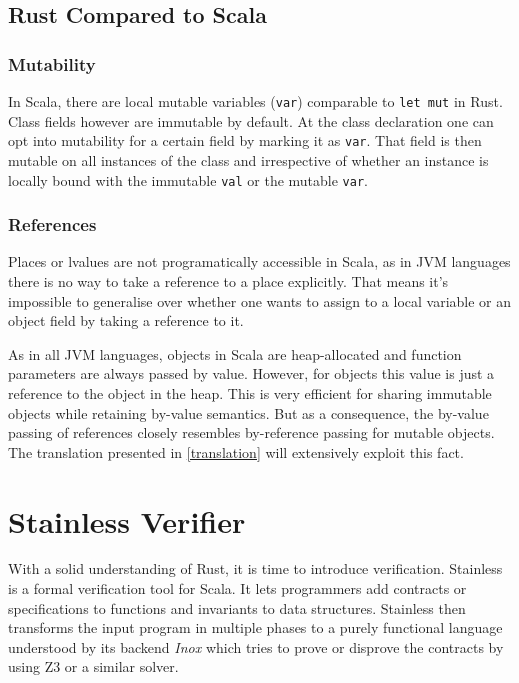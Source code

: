 \subsection{Rust Compared to Scala}

\subsubsection{Mutability}

In Scala, there are local mutable variables (\passthrough{\lstinline!var!})
comparable to \passthrough{\lstinline!let mut!} in Rust. Class fields however
are immutable by default. At the class declaration one can opt into mutability
for a certain field by marking it as \lstinline!var!. That field is then mutable
on all instances of the class and irrespective of whether an instance is locally
bound with the immutable \lstinline!val! or the mutable \lstinline!var!.

\subsubsection{References}

Places or lvalues are not programatically accessible in Scala, as in JVM
languages there is no way to take a reference to a place explicitly. That means
it's impossible to generalise over whether one wants to assign to a local
variable or an object field by taking a reference to it.

As in all JVM languages, objects in Scala are heap-allocated and function
parameters are always passed by value. However, for objects this value is just a
reference to the object in the heap. This is very efficient for sharing
immutable objects while retaining by-value semantics. But as a consequence, the
by-value passing of references closely resembles by-reference passing for
mutable objects. The translation presented in \autoref{translation} will
extensively exploit this fact.


\section{Stainless Verifier}

With a solid understanding of Rust, it is time to introduce verification.
Stainless \cite{stainless} is a formal verification tool for Scala. It lets
programmers add contracts or specifications to functions and invariants to data
structures. Stainless then transforms the input program in multiple phases to a
purely functional language understood by its backend \emph{Inox} \cite{inox}
which tries to prove or disprove the contracts by using Z3 \cite{z3} or a
similar solver.

